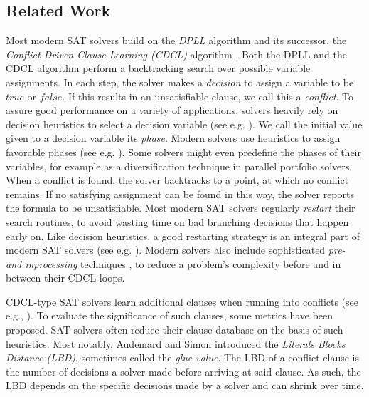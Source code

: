 \documentclass[12pt,a4paper,twoside]{scrartcl}
\numberwithin{equation}{section}
\begin{document}
\subsection{Related Work}
\label{sec:relatedWork}

Most modern SAT solvers build on the \textit{DPLL} \cite{dpllPaper} algorithm and its successor, the \textit{Conflict-Driven Clause Learning (CDCL)} algorithm \cite{cdclSolvers}. Both the DPLL and the CDCL algorithm perform a backtracking search over possible variable assignments. In each step, the solver makes a \textit{decision} to assign a variable to be $true$ or $false$. If this results in an unsatisfiable clause, we call this a \textit{conflict}. To assure good performance on a variety of applications, solvers heavily rely on decision heuristics to select a decision variable (see e.g. \cite{biere2015evaluating, moskewicz2001chaff, biere2008adaptive}). We call the initial value given to a decision variable its \textit{phase}. Modern solvers use heuristics to assign favorable phases (see e.g. \cite{componentPhases, cai2022better}). Some solvers might even predefine the phases of their variables, for example as a diversification technique in parallel portfolio solvers.
When a conflict is found, the solver backtracks to a point, at which no conflict remains. If no satisfying assignment can be found in this way, the solver reports the formula to be unsatisfiable. Most modern SAT solvers regularly \textit{restart} their search routines, to avoid wasting time on bad branching decisions that happen early on. Like decision heuristics, a good restarting strategy is an integral part of modern SAT solvers (see e.g. \cite{gomes1998boosting, gomes2000heavy, oh2015between}). Modern solvers also include sophisticated \textit{pre- and inprocessing} techniques \cite{biere2021preprocessing}, to reduce a problem's complexity before and in between their CDCL loops.

CDCL-type SAT solvers learn additional clauses when running into conflicts (see e.g., \cite{silva1996grasp, beame2003understanding, allUIPclauselearning, allUIPclauselearningBetter}). To evaluate the significance of such clauses, some metrics have been proposed. SAT solvers often reduce their clause database on the basis of such heuristics. Most notably, Audemard and Simon \cite{lbdPaper} introduced the \textit{Literals Blocks Distance (LBD)}, sometimes called the \textit{glue value}. The LBD of a conflict clause is the number of decisions a solver made before arriving at said clause. As such, the LBD depends on the specific decisions made by a solver and can shrink over time.
\end{document}
